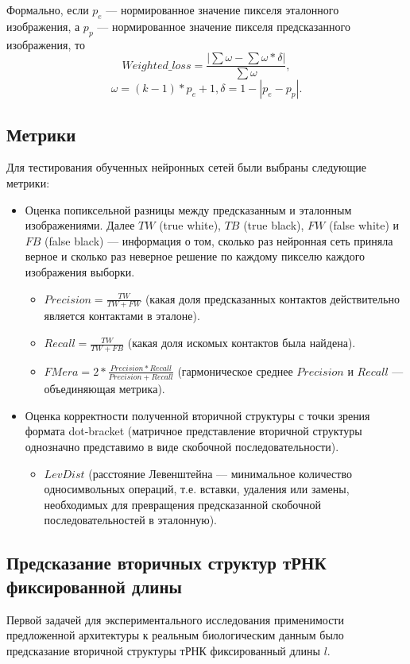 \documentclass[14pt]{matmex-diploma-custom}
\begin{document}
Формально, если $p_{e}$ --- нормированное значение пикселя эталонного изображения, а $p_{p}$ --- нормированное значение пикселя предсказанного изображения, то 
\[Weighted\_loss = \frac{|\sum \omega - \sum \omega \ast \delta |}{\sum \omega},\] 
\[\omega = (k - 1) \ast p_{e} + 1, \delta = 1 - |p_{e} - p_{p}|.\] 

\subsection{Метрики}
Для тестирования обученных нейронных сетей были выбраны следующие метрики:
\begin{itemize}
    \item Оценка попиксельной разницы между предсказанным и эталонным изображениями. Далее $TW$ (true white), $TB$ (true black), $FW$ (false white) и $FB$ (false black) --- информация о том, сколько раз нейронная сеть приняла верное и сколько раз неверное решение по каждому пикселю каждого изображения выборки.
    \begin{itemize}
        \item $Precision = \frac{TW}{TW + FW}$ (какая доля предсказанных контактов действительно является контактами в эталоне).
        \item $Recall = \frac{TW}{TW + FB}$ (какая доля искомых контактов была найдена).
        \item $FMera = 2 * \frac{Precision * Recall}{Precision + Recall}$ (гармоническое среднее $Precision$ и $Recall$ --- объединяющая метрика).
    \end{itemize}
    \item Оценка корректности полученной вторичной структуры с точки зрения формата dot-bracket (матричное представление вторичной структуры однозначно представимо в виде скобочной последовательности).
     \begin{itemize}
        \item $LevDist$ (расстояние Левенштейна --- минимальное количество односимвольных операций, т.е. вставки, удаления или замены, необходимых для превращения предсказанной скобочной последовательностей в эталонную).
    \end{itemize}   
\end{itemize}

\subsection{Предсказание вторичных структур тРНК фиксированной длины}
Первой задачей для экспериментального исследования применимости предложенной архитектуры к реальным биологическим данным было предсказание вторичной структуры тРНК фиксированный длины $l$. 
\end{document}
